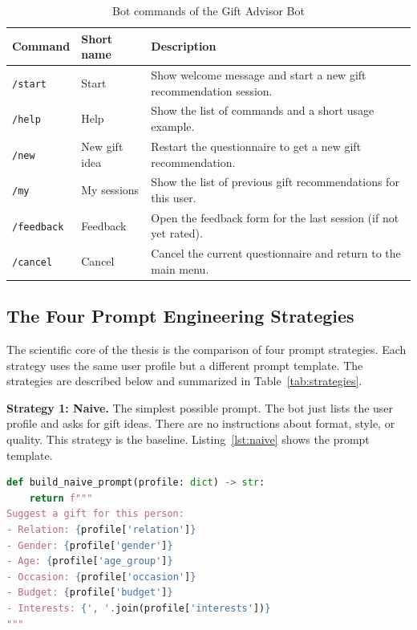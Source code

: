 \begin{table}[H]
\centering
\caption{Bot commands of the Gift Advisor Bot}
\label{tab:commands}
\begin{tabular}{p{2.5cm} p{4cm} p{7cm}}
\toprule
\textbf{Command} & \textbf{Short name} & \textbf{Description} \\
\midrule
\texttt{/start} & Start & Show welcome message and start a new gift recommendation session. \\
\texttt{/help} & Help & Show the list of commands and a short usage example. \\
\texttt{/new} & New gift idea & Restart the questionnaire to get a new gift recommendation. \\
\texttt{/my} & My sessions & Show the list of previous gift recommendations for this user. \\
\texttt{/feedback} & Feedback & Open the feedback form for the last session (if not yet rated). \\
\texttt{/cancel} & Cancel & Cancel the current questionnaire and return to the main menu. \\
\bottomrule
\end{tabular}
\end{table}

\subsection{The Four Prompt Engineering Strategies}
\label{sec:strategies}

The scientific core of the thesis is the comparison of four prompt strategies. Each strategy uses the same user profile but a different prompt template. The strategies are described below and summarized in Table~\ref{tab:strategies}.

\textbf{Strategy 1: Naive.} The simplest possible prompt. The bot just lists the user profile and asks for gift ideas. There are no instructions about format, style, or quality. This strategy is the baseline. Listing~\ref{lst:naive} shows the prompt template.

\begin{lstlisting}[language=Python, caption={Naive prompt template.}, label={lst:naive}]
def build_naive_prompt(profile: dict) -> str:
    return f"""
Suggest a gift for this person:
- Relation: {profile['relation']}
- Gender: {profile['gender']}
- Age: {profile['age_group']}
- Occasion: {profile['occasion']}
- Budget: {profile['budget']}
- Interests: {', '.join(profile['interests'])}
"""
\end{lstlisting}

